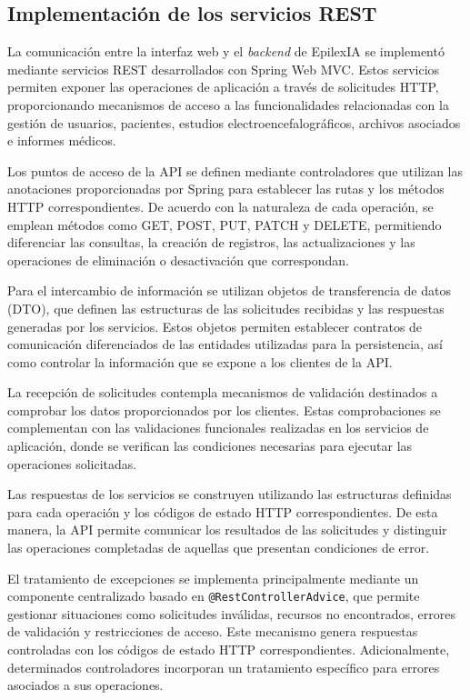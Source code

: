 \FloatBarrier


\subsection{Implementación de los servicios REST}

La comunicación entre la interfaz web y el \textit{backend}
de EpilexIA se implementó mediante servicios REST
desarrollados con Spring Web MVC. Estos servicios
permiten exponer las operaciones de aplicación
a través de solicitudes HTTP, proporcionando
mecanismos de acceso a las funcionalidades
relacionadas con la gestión de usuarios,
pacientes, estudios electroencefalográficos,
archivos asociados e informes médicos.

Los puntos de acceso de la API se definen mediante
controladores que utilizan las anotaciones
proporcionadas por Spring para establecer las
rutas y los métodos HTTP correspondientes.
De acuerdo con la naturaleza de cada operación,
se emplean métodos como GET, POST, PUT, PATCH
y DELETE, permitiendo diferenciar las consultas,
la creación de registros, las actualizaciones
y las operaciones de eliminación o desactivación
que correspondan.

Para el intercambio de información se utilizan
objetos de transferencia de datos (DTO), que
definen las estructuras de las solicitudes
recibidas y las respuestas generadas por los
servicios. Estos objetos permiten establecer
contratos de comunicación diferenciados de
las entidades utilizadas para la persistencia,
así como controlar la información que se
expone a los clientes de la API.

La recepción de solicitudes contempla mecanismos
de validación destinados a comprobar los datos
proporcionados por los clientes. Estas
comprobaciones se complementan con las
validaciones funcionales realizadas en los
servicios de aplicación, donde se verifican
las condiciones necesarias para ejecutar
las operaciones solicitadas.

Las respuestas de los servicios se construyen
utilizando las estructuras definidas para
cada operación y los códigos de estado HTTP
correspondientes. De esta manera, la API
permite comunicar los resultados de las
solicitudes y distinguir las operaciones
completadas de aquellas que presentan
condiciones de error.


El tratamiento de excepciones se implementa
principalmente mediante un componente centralizado
basado en \texttt{@RestControllerAdvice}, que
permite gestionar situaciones como solicitudes
inválidas, recursos no encontrados, errores de
validación y restricciones de acceso. Este
mecanismo genera respuestas controladas con
los códigos de estado HTTP correspondientes.
Adicionalmente, determinados controladores
incorporan un tratamiento específico para
errores asociados a sus operaciones.


